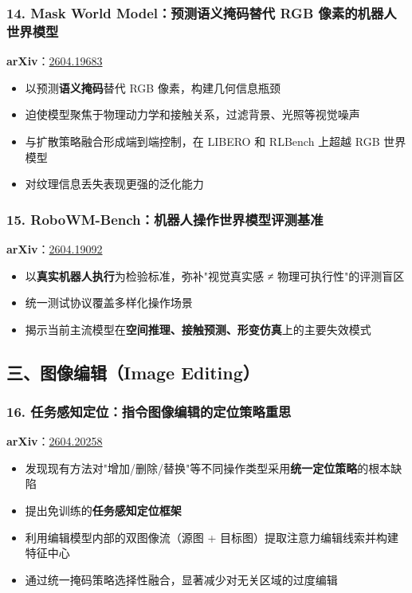 \subsubsection{14. Mask World Model：预测语义掩码替代 RGB 像素的机器人世界模型}

\textbf{arXiv}：\href{https://arxiv.org/abs/2604.19683}{2604.19683}

\begin{itemize}[leftmargin=1.5em]
  \item 以预测\textbf{语义掩码}替代 RGB 像素，构建几何信息瓶颈
  \item 迫使模型聚焦于物理动力学和接触关系，过滤背景、光照等视觉噪声
  \item 与扩散策略融合形成端到端控制，在 LIBERO 和 RLBench 上超越 RGB 世界模型
  \item 对纹理信息丢失表现更强的泛化能力
\end{itemize}

\subsubsection{15. RoboWM-Bench：机器人操作世界模型评测基准}

\textbf{arXiv}：\href{https://arxiv.org/abs/2604.19092}{2604.19092}

\begin{itemize}[leftmargin=1.5em]
  \item 以\textbf{真实机器人执行}为检验标准，弥补"视觉真实感 ≠ 物理可执行性"的评测盲区
  \item 统一测试协议覆盖多样化操作场景
  \item 揭示当前主流模型在\textbf{空间推理、接触预测、形变仿真}上的主要失效模式
\end{itemize}

\subsection{三、图像编辑（Image Editing）}

\subsubsection{16. 任务感知定位：指令图像编辑的定位策略重思}

\textbf{arXiv}：\href{https://arxiv.org/abs/2604.20258}{2604.20258}

\begin{itemize}[leftmargin=1.5em]
  \item 发现现有方法对"增加/删除/替换"等不同操作类型采用\textbf{统一定位策略}的根本缺陷
  \item 提出免训练的\textbf{任务感知定位框架}
  \item 利用编辑模型内部的双图像流（源图 + 目标图）提取注意力编辑线索并构建特征中心
  \item 通过统一掩码策略选择性融合，显著减少对无关区域的过度编辑
\end{itemize}


